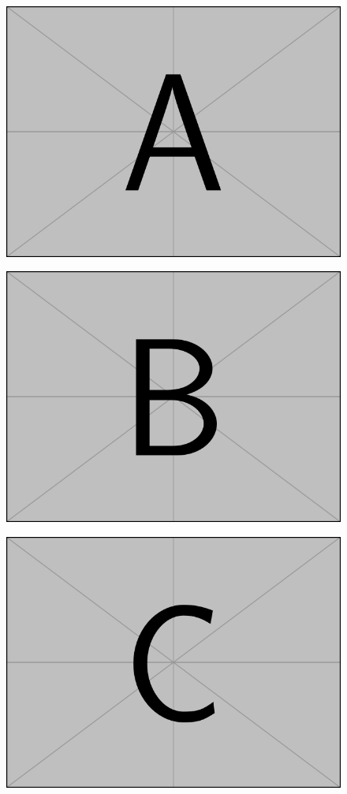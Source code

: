 \documentclass[10pt,conference,a4paper,nofonttune]{IEEEtran}
\begin{document}
\begin{figure}[t]
   \centering 
   \begin{minipage}[b]{.3\hsize}
      \centering
      \includegraphics[width=.8\hsize]{figure/example-image-a.pdf} %
      \label{Fig:Example:A}
   \end{minipage}
   \begin{minipage}[b]{.3\hsize}
      \centering
      \includegraphics[width=.8\hsize]{figure/example-image-b.pdf} %
      \label{Fig:Example:B}
   \end{minipage}
   \begin{minipage}[b]{.3\hsize}
      \centering
      \includegraphics[width=.8\hsize]{figure/example-image-c.pdf} %

\end{minipage}
\end{figure}
\end{document}
